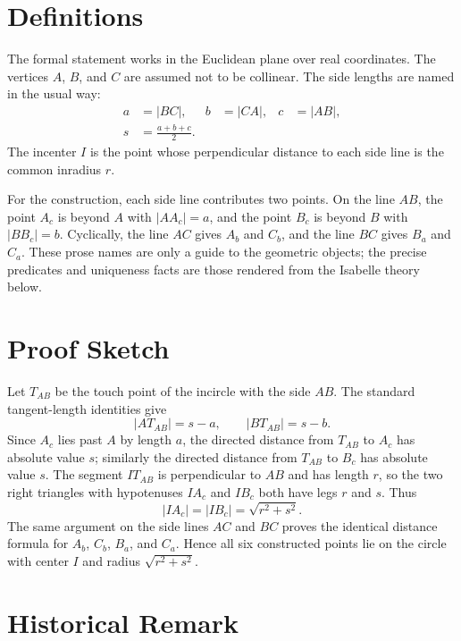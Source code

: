 \documentclass[11pt,a4paper]{article}
\begin{document}
\section{Definitions}

The formal statement works in the Euclidean plane over real coordinates.
The vertices \(A\), \(B\), and \(C\) are assumed not to be collinear.  The
side lengths are named in the usual way:
\[
  \begin{aligned}
    a &= |BC|, & b &= |CA|, & c &= |AB|, \\
    s &= \frac{a+b+c}{2}.
  \end{aligned}
\]
The incenter \(I\) is the point whose perpendicular distance to each side
line is the common inradius \(r\).

For the construction, each side line contributes two points.  On the line
\(AB\), the point \(A_c\) is beyond \(A\) with \(|AA_c| = a\), and the
point \(B_c\) is beyond \(B\) with \(|BB_c| = b\).  Cyclically, the line
\(AC\) gives \(A_b\) and \(C_b\), and the line \(BC\) gives \(B_a\) and
\(C_a\).  These prose names are only a guide to the geometric objects; the
precise predicates and uniqueness facts are those rendered from the
Isabelle theory below.

\section{Proof Sketch}

Let \(T_{AB}\) be the touch point of the incircle with the side \(AB\).
The standard tangent-length identities give
\[
  |AT_{AB}| = s-a, \qquad |BT_{AB}| = s-b.
\]
Since \(A_c\) lies past \(A\) by length \(a\), the directed distance from
\(T_{AB}\) to \(A_c\) has absolute value \(s\); similarly the directed
distance from \(T_{AB}\) to \(B_c\) has absolute value \(s\).  The segment
\(IT_{AB}\) is perpendicular to \(AB\) and has length \(r\), so the two
right triangles with hypotenuses \(IA_c\) and \(IB_c\) both have legs
\(r\) and \(s\).  Thus
\[
  |IA_c| = |IB_c| = \sqrt{r^{2}+s^{2}}.
\]
The same argument on the side lines \(AC\) and \(BC\) proves the identical
distance formula for \(A_b\), \(C_b\), \(B_a\), and \(C_a\).  Hence all six
constructed points lie on the circle with center \(I\) and radius
\(\sqrt{r^{2}+s^{2}}\).

\section{Historical Remark}
\end{document}
